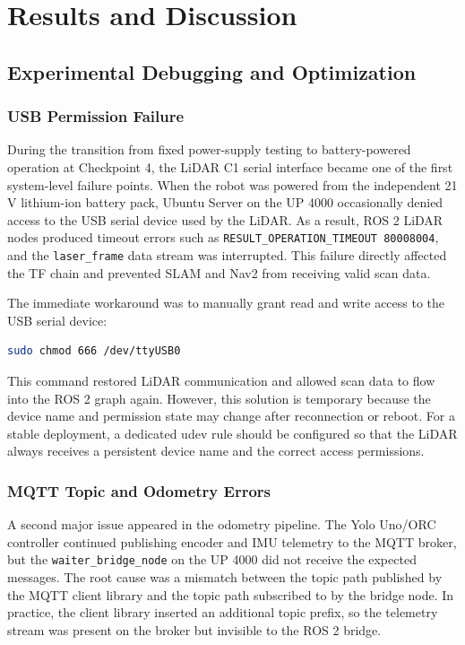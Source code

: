 \documentclass{llncs}
\begin{document}
\section{Results and Discussion}
\subsection{Experimental Debugging and Optimization}
\subsubsection{USB Permission Failure}
During the transition from fixed power-supply testing to battery-powered operation at Checkpoint 4, the LiDAR C1 serial interface became one of the first system-level failure points. When the robot was powered from the independent 21 V lithium-ion battery pack, Ubuntu Server on the UP 4000 occasionally denied access to the USB serial device used by the LiDAR. As a result, ROS 2 LiDAR nodes produced timeout errors such as \texttt{RESULT\_OPERATION\_TIMEOUT 80008004}, and the \texttt{laser\_frame} data stream was interrupted. This failure directly affected the TF chain and prevented SLAM and Nav2 from receiving valid scan data.

The immediate workaround was to manually grant read and write access to the USB serial device:

\begin{lstlisting}[language=bash]
sudo chmod 666 /dev/ttyUSB0
\end{lstlisting}

This command restored LiDAR communication and allowed scan data to flow into the ROS 2 graph again. However, this solution is temporary because the device name and permission state may change after reconnection or reboot. For a stable deployment, a dedicated udev rule should be configured so that the LiDAR always receives a persistent device name and the correct access permissions.

\subsubsection{MQTT Topic and Odometry Errors}
A second major issue appeared in the odometry pipeline. The Yolo Uno/ORC controller continued publishing encoder and IMU telemetry to the MQTT broker, but the \texttt{waiter\_bridge\_node} on the UP 4000 did not receive the expected messages. The root cause was a mismatch between the topic path published by the MQTT client library and the topic path subscribed to by the bridge node. In practice, the client library inserted an additional topic prefix, so the telemetry stream was present on the broker but invisible to the ROS 2 bridge.
\end{document}
